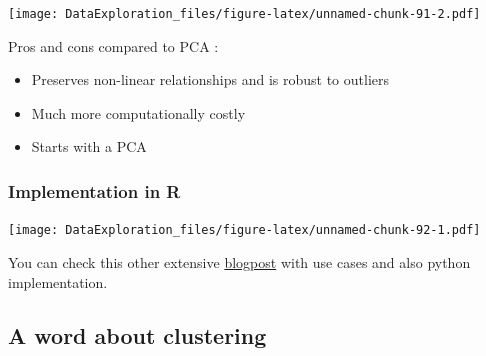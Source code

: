 \documentclass[
]{book}
\newenvironment{Shaded}{\begin{snugshade}}{\end{snugshade}}
\newcommand{\CommentTok}[1]{\textcolor[rgb]{0.56,0.35,0.01}{\textit{#1}}}
\newcommand{\DataTypeTok}[1]{\textcolor[rgb]{0.13,0.29,0.53}{#1}}
\newcommand{\DecValTok}[1]{\textcolor[rgb]{0.00,0.00,0.81}{#1}}
\newcommand{\KeywordTok}[1]{\textcolor[rgb]{0.13,0.29,0.53}{\textbf{#1}}}
\newcommand{\NormalTok}[1]{#1}
\newcommand{\OperatorTok}[1]{\textcolor[rgb]{0.81,0.36,0.00}{\textbf{#1}}}
\newcommand{\StringTok}[1]{\textcolor[rgb]{0.31,0.60,0.02}{#1}}
\providecommand{\tightlist}{%
  \setlength{\itemsep}{0pt}\setlength{\parskip}{0pt}}
\begin{document}
\texttt{[image: DataExploration\_files/figure-latex/unnamed-chunk-91-2.pdf]}

Pros and cons compared to PCA :

\begin{itemize}
\tightlist
\item
  Preserves non-linear relationships and is robust to outliers
\item
  Much more computationally costly
\item
  Starts with a PCA
\end{itemize}

\hypertarget{implementation-in-r}{%
\subsubsection{Implementation in R}\label{implementation-in-r}}

\begin{Shaded}
\end{Shaded}

\texttt{[image: DataExploration\_files/figure-latex/unnamed-chunk-92-1.pdf]}

You can check this other extensive \href{https://www.analyticsvidhya.com/blog/2017/01/t-sne-implementation-r-python/}{blogpost} with use cases and also python implementation.

\hypertarget{a-word-about-clustering}{%
\subsection{A word about clustering}\label{a-word-about-clustering}}
\end{document}
